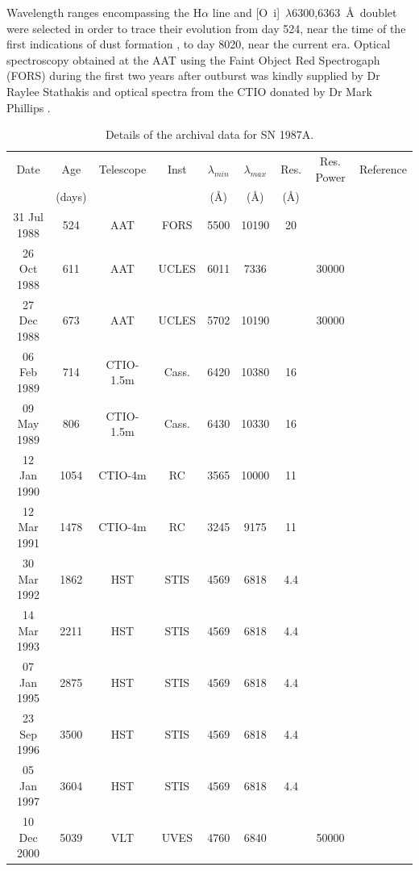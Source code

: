 \documentclass[useAMS,usenatbib,usegraphicx]{mnras}
\begin{document}
Wavelength ranges encompassing the H$\alpha$ line and [O~{\sc i}]~$\lambda$6300,6363~\AA\ doublet were selected in order to trace their 
evolution from day 524, near the time of the first indications of dust 
formation \citep{Wooden1993}, to day 8020, near the current era. Optical 
spectroscopy obtained at the AAT using the Faint Object Red Spectrogaph 
(FORS) during the first two years after outburst was kindly supplied by Dr Raylee 
Stathakis \citep{Spyromilio1991, Spyromilio1993, Hanuschik1993} and optical spectra from the CTIO donated by Dr Mark Phillips \citep{Suntzeff1991}.

\begin{table}
	\begin{minipage}{180mm}
	\caption{Details of the archival data for SN 1987A.}
	\label{tb:data}
  	\begin{tabular}{@{} ccccccccl @{}}
    	\hline
	Date & Age & Telescope  & Inst & $\lambda_{min}$ & $\lambda_{max}$ & Res. & Res. Power & Reference \\
	& (days) & & &(\AA) & (\AA)& (\AA)\\
	\hline
31 Jul 1988 & 524 & AAT & FORS & 5500 & 10190 & 20 & & \citet{Spyromilio1991} \\
26 Oct 1988 & 611 & AAT & UCLES & 6011 & 7336 &  & 30000 & \citet{Hanuschik1993, Spyromilio1993}\\
27 Dec 1988 & 673 & AAT & UCLES & 5702 & 10190 &  & 30000 & \citet{Hanuschik1993, Spyromilio1993}\\
06 Feb 1989 & 714 & CTIO-1.5m & Cass. & 6420 & 10380 & 16 & & \citet{Phillips1990}\\
09 May 1989 & 806 & CTIO-1.5m & Cass. & 6430 & 10330 & 16 & & \citet{Phillips1990}\\
12 Jan 1990 & 1054 & CTIO-4m & RC & 3565 & 10000 & 11 & & \cite{Suntzeff1991} \\
12 Mar 1991 & 1478 & CTIO-4m & RC & 3245 & 9175 & 11 & & \\
30 Mar 1992 & 1862 & HST & STIS & 4569 & 6818 & 4.4 &  & \citet{Wang1996}\\
14 Mar 1993 & 2211 & HST & STIS & 4569 & 6818 & 4.4 &  & \citet{Wang1996}\\
07 Jan 1995 & 2875 & HST & STIS & 4569 & 6818 & 4.4 &  & \citet{Chugai1997}\\
23 Sep 1996 & 3500 & HST & STIS & 4569 & 6818 & 4.4 &  \\ 
05 Jan 1997 & 3604 & HST & STIS & 4569 & 6818 & 4.4 &  \\
10 Dec 2000 & 5039 & VLT & UVES & 4760 & 6840 &  & 50000 & \citet{Groeningsson2006, Groeningsson2007}\\

\end{tabular}
\end{minipage}
\end{table}
\end{document}
